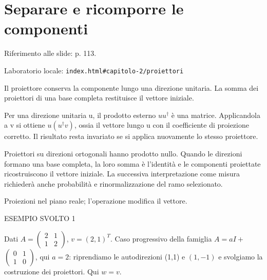 \Needspace{.43\textheight}
\section{Separare e ricomporre le componenti}
\label{c2-proiettori}

{\sffamily\small\color{Ink!70} Riferimento alle slide: p. 113.\par}

{\sffamily\small\color{Ink!70} Laboratorio locale: \nolinkurl{index.html#capitolo-2/proiettori}\par}

Il proiettore conserva la componente lungo una direzione unitaria. La somma dei proiettori di una base completa restituisce il vettore iniziale.\par

Per una direzione unitaria u, il prodotto esterno \(uu{}^{\dagger} \) è una matrice. Applicandola a v si ottiene \(u(u{}^{\dagger} v)\), ossia il vettore lungo u con il coefficiente di proiezione corretto. Il risultato resta invariato se si applica nuovamente lo stesso proiettore.\par

Proiettori su direzioni ortogonali hanno prodotto nullo. Quando le direzioni formano una base completa, la loro somma è l'identità e le componenti proiettate ricostruiscono il vettore iniziale. La successiva interpretazione come misura richiederà anche probabilità e rinormalizzazione del ramo selezionato.\par



Proiezioni nel piano reale; l'operazione modifica il vettore.\par


\Needspace{.36\textheight}\label{c2-proiettori-example-1}
{\sffamily\small\color{Accent} ESEMPIO SVOLTO 1\par}
Dati \(A=\)\(\begin{pmatrix}2&1\\1&2\end{pmatrix}\), \(v=(2{,}1)^{T}\). Caso progressivo della famiglia \(A=aI+\)\(\begin{pmatrix}0&1\\1&0\end{pmatrix}\), qui \(a=2\): riprendiamo le autodirezioni (1,1) e \((1,\allowbreak - 1)\) e svolgiamo la costruzione dei proiettori. Qui \(w=v\).\par


